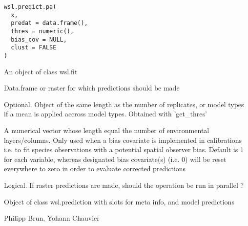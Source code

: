 \documentclass[a4paper]{book}
\begin{document}
%
\begin{Usage}
\begin{verbatim}
wsl.predict.pa(
  x,
  predat = data.frame(),
  thres = numeric(),
  bias_cov = NULL,
  clust = FALSE
)
\end{verbatim}
\end{Usage}
%
\begin{Arguments}
\begin{ldescription}
\item[\code{x}] An object of class wsl.fit

\item[\code{predat}] Data.frame or raster for which predictions should be made

\item[\code{thres}] Optional. Object of the same length as the number of replicates, or model
types if a mean is applied accross model types. Obtained with 'get\_thres'

\item[\code{bias\_cov}] A numerical vector whose length equal the number of environmental layers/columns.
Only used when a bias covariate is implemented in calibrations i.e. to fit species observations with
a potential spatial observer bias. Default is 1 for each variable, whereas designated bias covariate(s)
(i.e. 0) will be reset everywhere to zero in order to evaluate corrected predictions

\item[\code{clust}] Logical. If raster predictions are made, should the operation be run in parallel ?
\end{ldescription}
\end{Arguments}
%
\begin{Value}
Object of class wsl.prediction with slots for meta info, and model predictions
\end{Value}
%
\begin{Author}\relax
Philipp Brun, Yohann Chauvier
\end{Author}
%
\end{document}

